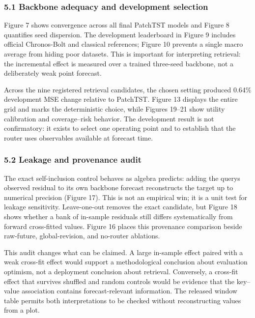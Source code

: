 \documentclass[
]{article}
\begin{document}
\subsubsection{5.1 Backbone adequacy and development
selection}\label{51-backbone-adequacy-and-development-selection}

Figure 7 shows convergence across all final PatchTST models and Figure 8
quantifies seed dispersion. The development leaderboard in Figure 9
includes official Chronos-Bolt and classical references; Figure 10
prevents a single macro average from hiding poor datasets. This is
important for interpreting retrieval: the incremental effect is measured
over a trained three-seed backbone, not a deliberately weak point
forecast.

Across the nine registered retrieval candidates, the chosen setting
produced 0.64\% development MSE change relative to PatchTST. Figure 13
displays the entire grid and marks the deterministic choice, while
Figures 19--21 show utility calibration and coverage--risk behavior. The
development result is not confirmatory: it exists to select one
operating point and to establish that the router uses observables
available at forecast time.

\subsubsection{5.2 Leakage and provenance
audit}\label{52-leakage-and-provenance-audit}

The exact self-inclusion control behaves as algebra predicts: adding the
query\textquotesingle s observed residual to its own backbone forecast
reconstructs the target up to numerical precision (Figure 17). This is
not an empirical win; it is a unit test for leakage sensitivity.
Leave-one-out removes the exact candidate, but Figure 18 shows whether a
bank of in-sample residuals still differs systematically from forward
cross-fitted values. Figure 16 places this provenance comparison beside
raw-future, global-revision, and no-router ablations.

This audit changes what can be claimed. A large in-sample effect paired
with a weak cross-fit effect would support a methodological conclusion
about evaluation optimism, not a deployment conclusion about retrieval.
Conversely, a cross-fit effect that survives shuffled and random
controls would be evidence that the key--value association contains
forecast-relevant information. The released window table permits both
interpretations to be checked without reconstructing values from a plot.
\end{document}

